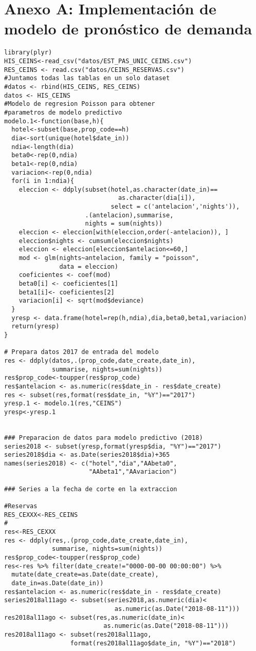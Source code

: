 \chapter{Anexo A: Implementación de modelo de pronóstico de demanda}
\label{ch:anexoa}

\begin{verbatim}
library(plyr)
HIS_CEINS<-read_csv("datos/EST_PAS_UNIC_CEINS.csv")
RES_CEINS <- read.csv("datos/CEINS_RESERVAS.csv")
#Juntamos todas las tablas en un solo dataset
#datos <- rbind(HIS_CEINS, RES_CEINS)
datos <- HIS_CEINS
#Modelo de regresion Poisson para obtener
#parametros de modelo predictivo
modelo.1<-function(base,h){
  hotel<-subset(base,prop_code==h)
  dia<-sort(unique(hotel$date_in))
  ndia<-length(dia)
  beta0<-rep(0,ndia)
  beta1<-rep(0,ndia)
  variacion<-rep(0,ndia)
  for(i in 1:ndia){
    eleccion <- ddply(subset(hotel,as.character(date_in)==
                               as.character(dia[i]),
                             select = c('antelacion','nights')),
                      .(antelacion),summarise, 
                      nights = sum(nights))
    eleccion <- eleccion[with(eleccion,order(-antelacion)), ]
    eleccion$nights <- cumsum(eleccion$nights)
    eleccion <- eleccion[eleccion$antelacion<=60,]
    mod <- glm(nights~antelacion, family = "poisson", 
               data = eleccion)
    coeficientes <- coef(mod)
    beta0[i] <- coeficientes[1]
    beta1[i]<- coeficientes[2]
    variacion[i] <- sqrt(mod$deviance)
  }
  yresp <- data.frame(hotel=rep(h,ndia),dia,beta0,beta1,variacion)
  return(yresp)
}

# Prepara datos 2017 de entrada del modelo
res <- ddply(datos,.(prop_code,date_create,date_in), 
             summarise, nights=sum(nights))
res$prop_code<-toupper(res$prop_code)
res$antelacion <- as.numeric(res$date_in - res$date_create)
res <- subset(res,format(res$date_in, "%Y")=="2017")
yresp.1 <- modelo.1(res,"CEINS")
yresp<-yresp.1


### Preparacion de datos para modelo predictivo (2018)
series2018 <- subset(yresp,format(yresp$dia, "%Y")=="2017")
series2018$dia <- as.Date(series2018$dia)+365
names(series2018) <- c("hotel","dia","AAbeta0",
                       "AAbeta1","AAvariacion")

### Series a la fecha de corte en la extraccion

#Reservas
RES_CEXXX<-RES_CEINS
#
res<-RES_CEXXX
res <- ddply(res,.(prop_code,date_create,date_in), 
             summarise, nights=sum(nights))
res$prop_code<-toupper(res$prop_code)
res<-res %>% filter(date_create!="0000-00-00 00:00:00") %>% 
  mutate(date_create=as.Date(date_create),
  date_in=as.Date(date_in))
res$antelacion <- as.numeric(res$date_in - res$date_create)
series2018al11ago <- subset(series2018,as.numeric(dia)<
                              as.numeric(as.Date("2018-08-11")))
res2018al11ago <- subset(res,as.numeric(date_in)<
                           as.numeric(as.Date("2018-08-11")))
res2018al11ago <- subset(res2018al11ago,
                  format(res2018al11ago$date_in, "%Y")=="2018")


\end{verbatim}
